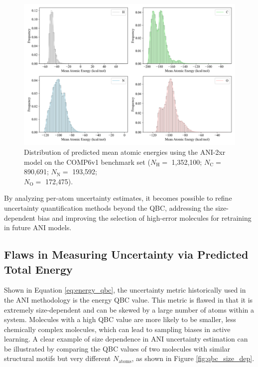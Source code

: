 \begin{figure}[H]
    \centering
    \includegraphics[width=1\linewidth]{Images/2xr_outputs/2xr_comp6v1_mean-ae-per-atomtype.png}
    \caption[Mean atomic energy prediction per-atom with ANI-2xr]{Distribution of predicted mean atomic energies using the ANI-2xr model on the COMP6v1 benchmark set ($N_\text{H}=$ 1,352,100; 
    $N_\text{C}=$ 890,691; 
    $N_\text{N}=$ 193,592;\\ 
    $N_\text{O}=$ 172,475).}
    \label{fig:2xr_comp6v1_mean-ae-per-atomtype}
\end{figure}

By analyzing per-atom uncertainty estimates, it becomes possible to refine uncertainty quantification methods beyond the QBC, addressing the size-dependent bias and improving the selection of high-error molecules for retraining in future ANI models.

\subsection{Flaws in Measuring Uncertainty via Predicted Total Energy}
\label{subsec:flaws_in_qbc}

Shown in Equation \ref{eq:energy_qbc}, the uncertainty metric historically used in the ANI methodology is the energy QBC value. 
This metric is flawed in that it is extremely size-dependent and can be skewed by a large number of atoms within a system. 
Molecules with a high QBC value are more likely to be smaller, less chemically complex molecules, which can lead to sampling biases in active learning.
A clear example of size dependence in ANI uncertainty estimation can be illustrated by comparing the QBC values of two molecules with similar structural motifs but very different $N_{\text{atoms}}$, as shown in Figure \ref{fig:qbc_size_dep}.

